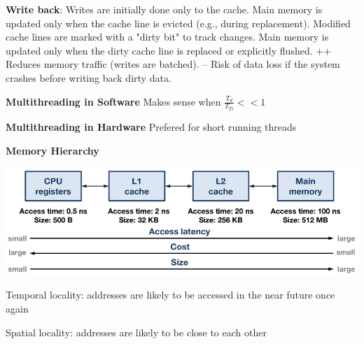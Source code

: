 \documentclass[english]{latex4ei/latex4ei_sheet}
\begin{document}
\textbf{Write back}: Writes are initially done only to the cache. Main memory is updated only when the cache line is evicted (e.g., during replacement). Modified cache lines are marked with a "dirty bit" to track changes. Main memory is updated only when the dirty cache line is replaced or explicitly flushed. ++ Reduces memory traffic (writes are batched). -- Risk of data loss if the system crashes before writing back dirty data.

\textbf{Multithreading in Software} Makes sense when $\frac{T_d}{T_{Ti}} << 1$

\textbf{Multithreading in Hardware} Prefered for short running threads



\textbf{Memory Hierarchy}

\begin{center}
	\includegraphics[width = \linewidth]{images/4.ProcessorArchitecture/MemoryHierarchy.png}
\end{center}

Temporal locality: addresses are likely to be accessed in the near future once again

Spatial locality: addresses are likely to be close to each other
\end{document}
